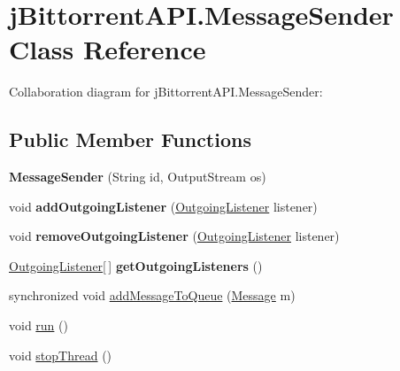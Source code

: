 \hypertarget{classj_bittorrent_a_p_i_1_1_message_sender}{
\section{jBittorrentAPI.MessageSender Class Reference}
\label{classj_bittorrent_a_p_i_1_1_message_sender}
}
Collaboration diagram for jBittorrentAPI.MessageSender:\subsection*{Public Member Functions}
\begin{DoxyCompactItemize}
\item 
\hypertarget{classj_bittorrent_a_p_i_1_1_message_sender_ae0b0ba0699973667798e01c4385092ab}{
{\bfseries MessageSender} (String id, OutputStream os)}
\label{classj_bittorrent_a_p_i_1_1_message_sender_ae0b0ba0699973667798e01c4385092ab}

\item 
\hypertarget{classj_bittorrent_a_p_i_1_1_message_sender_a8cb1e6bf8e2f6b9112dea4d406889c31}{
void {\bfseries addOutgoingListener} (\hyperlink{interfacej_bittorrent_a_p_i_1_1_outgoing_listener}{OutgoingListener} listener)}
\label{classj_bittorrent_a_p_i_1_1_message_sender_a8cb1e6bf8e2f6b9112dea4d406889c31}

\item 
\hypertarget{classj_bittorrent_a_p_i_1_1_message_sender_a38c52462e64fa261ae24058581cb446b}{
void {\bfseries removeOutgoingListener} (\hyperlink{interfacej_bittorrent_a_p_i_1_1_outgoing_listener}{OutgoingListener} listener)}
\label{classj_bittorrent_a_p_i_1_1_message_sender_a38c52462e64fa261ae24058581cb446b}

\item 
\hypertarget{classj_bittorrent_a_p_i_1_1_message_sender_a5cfc95d395301fa761979ebc81468fd3}{
\hyperlink{interfacej_bittorrent_a_p_i_1_1_outgoing_listener}{OutgoingListener}\mbox{[}$\,$\mbox{]} {\bfseries getOutgoingListeners} ()}
\label{classj_bittorrent_a_p_i_1_1_message_sender_a5cfc95d395301fa761979ebc81468fd3}

\item 
synchronized void \hyperlink{classj_bittorrent_a_p_i_1_1_message_sender_af5abb658e232e429343c8deff1569736}{addMessageToQueue} (\hyperlink{classj_bittorrent_a_p_i_1_1_message}{Message} m)
\item 
void \hyperlink{classj_bittorrent_a_p_i_1_1_message_sender_aa9773f42b5d477b971f1438e458aa5a5}{run} ()
\item 
void \hyperlink{classj_bittorrent_a_p_i_1_1_message_sender_a8a81081eff1e8b940205a86b457d666b}{stopThread} ()
\end{DoxyCompactItemize}
